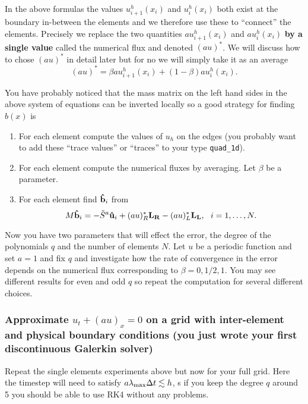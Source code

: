 \documentclass[12pt]{article}
\begin{document}
In the above formulas the values $u_{i+1}^h(x_i)$ and $u_{i}^h(x_i)$ both exist at the boundary in-between the elements and we therefore use these to ``connect'' the elements. Precisely we replace the two quantities $au_{i+1}^h(x_i)$ and $au_{i}^h(x_i)$ {\bf by a single value} called the numerical flux and denoted $(au)^\ast$. We will discuss how to chose $(au)^\ast$ in detail later but for no we will simply take it as an average 
\[
(au)^\ast = \beta au_{i+1}^h(x_i) + (1- \beta) au_{i}^h(x_i).
\]  

You have probably noticed that the mass matrix on the left hand sides in the above system of equations can be inverted locally so a good strategy for finding $b(x)$ is 
\begin{enumerate}
\item For each element compute the values of $u_h$ on the edges (you probably want to add these ``trace values'' or ``traces'' to your type \verb+quad_1d+). 
\item For each element compute the numerical fluxes by averaging. Let $\beta$ be a parameter.    
\item For each element find ${\bf \hat{b}}_i$ from
\[
M {\bf \hat{b}}_i = -\tilde{S}^a{\bf  \hat{u}}_i + (a u)^\ast_R {\bf L_R} - (a u)^\ast_L {\bf L_L}, \ \ i = 1,\ldots,N.
\]
\end{enumerate}

Now you have two parameters that will effect the error, the degree of the polynomials $q$ and the number of elements $N$. Let $u$ be a periodic function and set $a = 1$ and fix $q$ and investigate how the rate of convergence in the error depends on the numerical flux corresponding to $\beta = 0, 1/2, 1$. You may see different results for even and odd $q$ so repeat the computation for several different choices. 

\subsubsection*{Approximate $u_t + (au)_x = 0$ on a grid with inter-element and physical boundary conditions (you just wrote your first discontinuous Galerkin solver)} 
Repeat the single elements experiments above but now for your full grid. Here the timestep will need to satisfy  $a \lambda_{\rm max} \Delta t  \lesssim h$, s if you keep the degree $q$ around 5 you should be able to use RK4 without any problems.    
\end{document}
